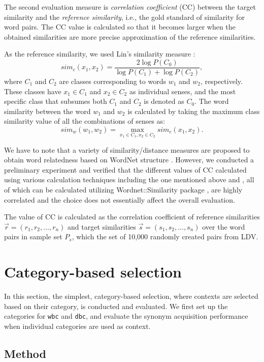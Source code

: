 \documentclass[english]{jnlp_1.4}
\begin{document}
The second evaluation measure is {\em correlation coefficient} (CC)
between the target similarity and the {\em reference similarity},
i.e., the gold standard of similarity for word pairs. The CC value is
calculated so that it becomes larger when the obtained similarities
are more precise approximation of the reference similarities.


As the reference similarity, we used Lin's similarity measure
\cite{Lin:98:information}:
\[
  sim_c(x_1, x_2) = \frac{2\log P(C_0)}{\log P(C_1) + \log P(C_2)},
\]
where $C_1$ and $C_2$ are classes corresponding to words $w_1$ and
$w_2$, respectively. These classes have $x_1 \in C_1$ and $x_2 \in
C_2$ as individual senses, and the most specific class that subsumes
both $C_1$ and $C_2$ is denoted as $C_0$. The word similarity between
the word $w_1$ and $w_2$ is calculated by taking the maximum class
similarity value of all the combinations of senses as:
\[
  sim_w(w_1, w_2) = \max_{x_1 \in C_1, x_2 \in C_2} sim_c(x_1, x_2).
\]

We have to note that a variety of similarity/distance measures are
proposed to obtain word relatedness based on WordNet structure
\cite{Budanitsky:06}. However, we conducted a preliminary experiment
and verified that the different values of CC calculated using various
calculation techniques including the one mentioned above and
\cite{Jiang:97,Hirst:98}, all of which can be calculated utilizing
Wordnet::Similarity package \cite{Pedersen:04}, are highly correlated
and the choice does not essentially affect the overall evaluation.

The value of CC is calculated as the correlation coefficient of
reference similarities $\vec r = (r_1, r_2, \ldots, r_n)$ and target
similarities $\vec s = (s_1, s_2, \ldots, s_n)$ over the word pairs in
sample set $P_s$, which the set of 10,000 randomly created pairs from
LDV.

\section{Category-based selection}

In this section, the simplest, category-based selection, where
contexts are selected based on their category, is conducted and
evaluated. We first set up the categories for {\tt wbc} and {\tt dbc},
and evaluate the synonym acquisition performance when individual
categories are used as context.

\subsection{Method}
\end{document}
